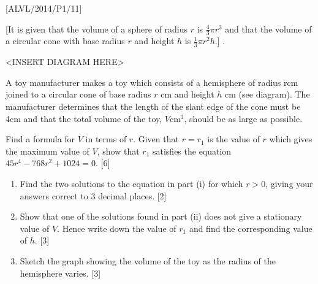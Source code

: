 \item {[}ALVL/2014/P1/11{]}

{[}It is given that the volume of a sphere of radius $r$ is $\frac{4}{3}\pi r^{3}$
and that the volume of a circular cone with base radius $r$ and height
$h$ is $\frac{1}{3}\pi r^{2}h$.{]} . 
\noindent \begin{center}
<INSERT DIAGRAM HERE>
\par\end{center}

A toy manufacturer makes a toy which consists of a hemisphere of radius
rcm joined to a circular cone of base radius $r$ cm and height $h$
cm (see diagram). The manufacturer determines that the length of the
slant edge of the cone must be 4cm and that the total volume of the
toy, $V\text{cm}^{3}$, should be as large as possible. 

Find a formula for $V$ in terms of $r$. Given that $r=r_{1}$ is
the value of $r$ which gives the maximum value of $V$, show that
$r_{1}$ satisfies the equation $45r^{4}-768r^{2}+1024=0$.\hfill{}
{[}6{]}
\begin{enumerate}
\item Find the two solutions to the equation in part (i) for which $r>0$,
giving your answers correct to 3 decimal places. \hfill{}{[}2{]}
\item Show that one of the solutions found in part (ii) does not give a
stationary value of $V$. Hence write down the value of $r_{1}$ and
find the corresponding value of $h$. \hfill{}{[}3{]}
\item Sketch the graph showing the volume of the toy as the radius of the
hemisphere varies. \hfill{}{[}3{]}
\end{enumerate}
